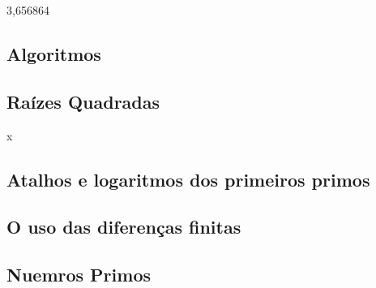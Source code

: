 3,656864




\subsection{Algoritmos}

\subsection{Raízes Quadradas}x 




\subsection{Atalhos e logaritmos dos primeiros primos}
\subsection{O uso das diferenças finitas}
\subsection{Nuemros Primos}


